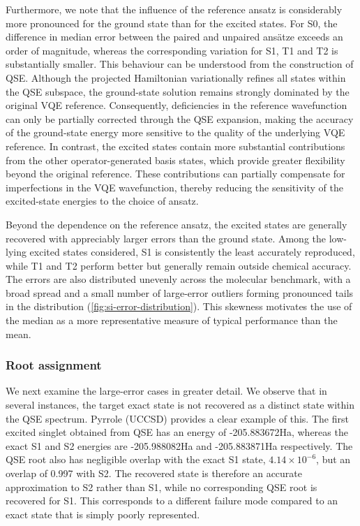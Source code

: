 Furthermore, we note that the influence of the reference ansatz is considerably more pronounced for the ground state than for the excited states. For S0, the difference in median error between the paired and unpaired ansätze exceeds an order of magnitude, whereas the corresponding variation for S1, T1 and T2 is substantially smaller. 
This behaviour can be understood from the construction of QSE. Although the projected Hamiltonian variationally refines all states within the QSE subspace, the ground-state solution remains strongly dominated by the original VQE reference. 
Consequently, deficiencies in the reference wavefunction can only be partially corrected through the QSE expansion, making the accuracy of the ground-state energy more sensitive to the quality of the underlying VQE reference.
In contrast, the excited states contain more substantial contributions from the other operator-generated basis states, which provide greater flexibility beyond the original reference. These contributions can partially compensate for imperfections in the VQE wavefunction, thereby reducing the sensitivity of the excited-state energies to the choice of ansatz.
 
Beyond the dependence on the reference ansatz, the excited states are generally recovered with appreciably larger errors than the ground state. 
Among the low-lying excited states considered, S1 is consistently the least accurately reproduced, while T1 and T2 perform better but generally remain outside chemical accuracy. 
The errors are also distributed unevenly across the molecular benchmark, with a broad spread and a small number of large-error outliers forming pronounced tails in the distribution (\cref{fig:si-error-distribution}). This skewness motivates the use of the median as a more representative measure of typical performance than the mean. 

\subsubsection{Root assignment}
We next examine the large-error cases in greater detail. We observe that in several instances, the target exact state is not recovered as a distinct state within the QSE spectrum. 
Pyrrole (UCCSD) provides a clear example of this. The first excited singlet obtained from QSE has an energy of -205.883672Ha, whereas the exact S1 and S2 energies are -205.988082Ha and -205.883871Ha respectively. 
The QSE root also has negligible overlap with the exact S1 state, $4.14\times10^{-6}$, but an overlap of 0.997 with S2. 
The recovered state is therefore an accurate approximation to S2 rather than S1, while no corresponding QSE root is recovered for S1. 
This corresponds to a different failure mode compared to an exact state that is simply poorly represented.

